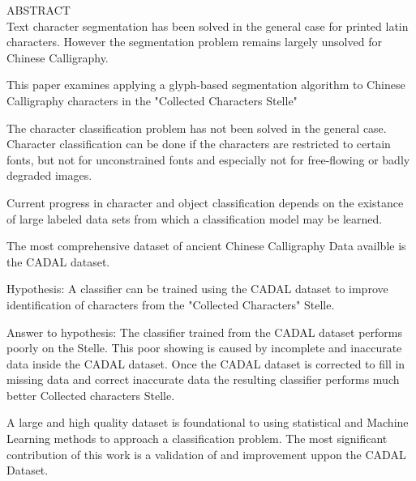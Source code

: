 ABSTRACT\\


Text character segmentation has been solved in the general case for printed latin characters.  However the segmentation problem remains largely unsolved for Chinese Calligraphy.

This paper examines applying a glyph-based segmentation algorithm to Chinese Calligraphy characters in the "Collected Characters Stelle"







The character classification problem has not been solved in the general case.  Character classification can be done if the characters are restricted to certain fonts, but not for unconstrained fonts and especially not for free-flowing or badly degraded images.

Current progress in character and object classification depends on the existance of large labeled data sets from which a classification model may be learned.

The most comprehensive dataset of ancient Chinese Calligraphy Data availble is the CADAL dataset.

Hypothesis:  A classifier can be trained using the CADAL dataset to improve identification of characters from the "Collected Characters" Stelle.

Answer to hypothesis:  The classifier trained from the CADAL dataset performs poorly on the Stelle.  This poor showing is caused by incomplete and inaccurate data inside the CADAL dataset.  Once the CADAL dataset is corrected to fill in missing data and correct inaccurate data the resulting classifier performs much better Collected characters Stelle.

A large and high quality dataset is foundational to using statistical and Machine Learning methods to approach a classification problem.  The most significant contribution of this work is a validation of and improvement uppon the CADAL Dataset.

\newpage
